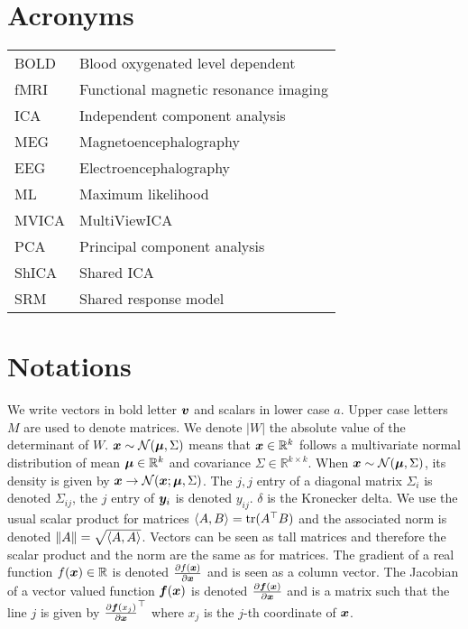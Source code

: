     \chapter*{Acronyms}
    \begin{tabular}{ll}
      BOLD & Blood oxygenated level dependent \\
      fMRI & Functional magnetic resonance imaging \\
        ICA & Independent component analysis \\
      MEG & Magnetoencephalography \\
            EEG & Electroencephalography \\
        ML & Maximum likelihood \\
      MVICA & MultiViewICA \\
      PCA & Principal component analysis \\
      ShICA & Shared ICA \\
      SRM & Shared response model \\

    \end{tabular}

    \chapter*{Notations}
    We write vectors in bold letter $\boldsymbol{v}$ and scalars in lower case $a$. Upper case letters $M$ are used to denote
    matrices. We denote $|W|$ the absolute value of the determinant of $W$. $\boldsymbol{x} \sim \mathcal{N}(\boldsymbol{\mu}, \Sigma)$ means that $\boldsymbol{x} \in \mathbb{R}^k$ follows a multivariate normal distribution of mean $\boldsymbol{\mu} \in \mathbb{R}^k$ and
    covariance $\Sigma \in \mathbb{R}^{k \times k}$. When $\boldsymbol{x} \sim \mathcal{N}(\boldsymbol{\mu},
    \Sigma)$, its density is given by $\boldsymbol{x} \rightarrow \mathcal{N}(\boldsymbol{x}; \boldsymbol{\mu}, \Sigma)$. The $j, j$ entry of a diagonal matrix $\Sigma_i$ is denoted $\Sigma_{ij}$, the $j$ entry of $\boldsymbol{y}_i$ is denoted $y_{ij}$. $\delta$ is the Kronecker delta.
    We use the usual scalar product for matrices $\langle{ A },{ B}\rangle =
    \mathop{\mathrm{tr}}(A^{\top} B)$ and the associated norm is denoted $\|A\| = \sqrt{\langle{
        A},{ A }\rangle}$. Vectors can be seen as tall matrices and
    therefore the scalar product and the norm are the same as for matrices.
    The gradient of a real function $f(\boldsymbol{x}) \in \mathbb{R}$ is denoted $\frac{ \partial f(\boldsymbol{x})}{\partial \boldsymbol{x}}$
    and is seen as a column vector. The Jacobian of a vector valued
    function $\boldsymbol{f}(\boldsymbol{x})$ is denoted $\frac{ \partial \boldsymbol{f}(\boldsymbol{x})}{\partial \boldsymbol{x}}$ and is a matrix
    such that the line $j$ is given by $\frac{ \partial \boldsymbol{f}(x_j)}{\partial \boldsymbol{x}}^{\top}$ where $x_j$
    is the $j$-th coordinate of $\boldsymbol{x}$.
\endgroup
